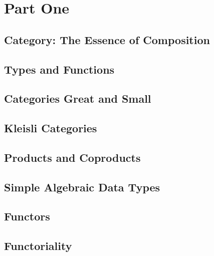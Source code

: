 \part{Part One}

\chapter{Category: The Essence of Composition}\label{category-the-essence-of-composition}


\chapter{Types and Functions}\label{types-and-functions}


\chapter{Categories Great and Small}\label{categories-great-and-small}


\chapter{Kleisli Categories}\label{kleisli-categories-page}


\chapter{Products and Coproducts}\label{products-and-coproducts}


\chapter{Simple Algebraic Data Types}\label{simple-algebraic-data-types}


\chapter{Functors}\label{chap-functors}


\chapter{Functoriality}\label{functoriality}


